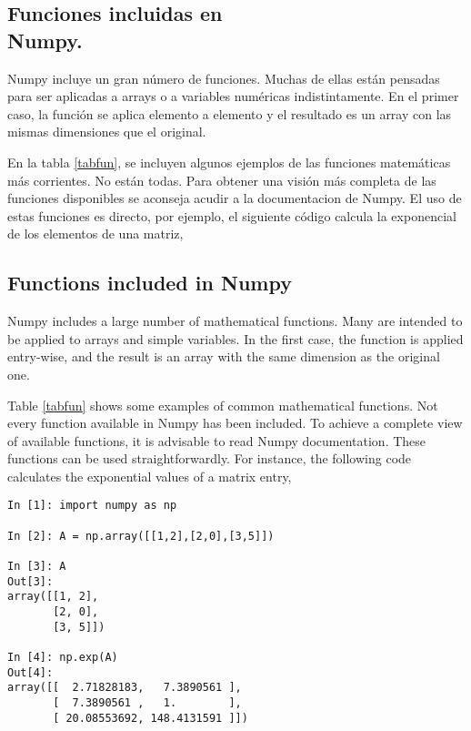 \begin{paracol}{2}
\subsection{Funciones incluidas en\\ Num\-py.} 
Numpy incluye un gran número de funciones. Muchas de ellas  están pensadas para ser aplicadas a arrays o a variables numéricas indistintamente. En el primer caso, la función se aplica elemento a elemento y el resultado es un array con las mismas dimensiones que el original. 

En la tabla \ref{tabfun}, se incluyen algunos ejemplos de las funciones matemáticas más corrientes. No están todas. Para obtener una visión más completa de las funciones disponibles se aconseja acudir a la documentacion de Numpy.
El uso de estas funciones es directo, por ejemplo, el siguiente código calcula la exponencial de los elementos de una matriz,
\switchcolumn
\subsection{Functions included in Numpy}
Numpy includes a large number of mathematical functions. Many are intended to be applied to arrays and simple variables. In the first case, the function is applied entry-wise, and the result is an array with the same dimension as the original one.

Table \ref{tabfun} shows some examples of common mathematical functions. Not every function available in Numpy has been included. To achieve a complete view of available functions, it is advisable to read Numpy documentation.
These functions can be used straightforwardly. For instance, the following code calculates the exponential values of a matrix entry,   
\end{paracol}

\begin{center}
    \begin{minipage}{0.5\textwidth}
        \begin{verbatim}
In [1]: import numpy as np

In [2]: A = np.array([[1,2],[2,0],[3,5]])

In [3]: A
Out[3]: 
array([[1, 2],
       [2, 0],
       [3, 5]])

In [4]: np.exp(A)
Out[4]: 
array([[  2.71828183,   7.3890561 ],
       [  7.3890561 ,   1.        ],
       [ 20.08553692, 148.4131591 ]])
        \end{verbatim}
    \end{minipage}
\end{center}

